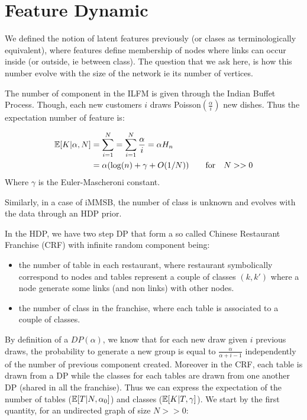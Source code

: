 \section{Feature Dynamic}

We defined the notion of latent features previously (or clases as terminologically equivalent), where features define membership of nodes where links can occur inside (or outside, ie between class).  The question that we ask here, is how this number evolve with the size of the network ie its number of vertices.


The number of component in the ILFM is given through the Indian Buffet Process. Though, each new customers $i$ draws Poisson$(\frac{\alpha}{i})$ new dishes. Thus the expectation number of feature is:

\begin{align*}
\mathbb{E}[K|\alpha, N] &= \sum_{i=1}^{N} = \sum_{i=1}^N \frac{\alpha}{i} = \alpha H_n \\
&= \alpha(\log(n) + \gamma +O(1/N) ) \qquad  \textnormal{for} \quad N >> 0
\end{align*}
Where $\gamma$ is the Euler-Mascheroni constant.

Similarly, in a case of iMMSB, the number of class is unknown and evolves with the data through an HDP prior.

In the HDP, we have two step DP that form a so called Chinese
Restaurant Franchise (CRF) with infinite random component being:
\begin{itemize}
\item the number of
table in each restaurant, where restaurant symbolically correspond to
nodes and tables represent a couple of classes $(k,k')$ where a node generate some links (and non links) with other nodes. 
\item the
number of class in the franchise, where each table is associated to a couple of classes.
\end{itemize}

By definition of a \(DP(\alpha)\), we know that for each new draw given
\(i\) previous draws, the probability to generate a new group is equal
to \(\frac{\alpha}{\alpha +i-1}\) independently of the number of previous
component created. Moreover in the CRF, each table is drawn from a DP while the classes for each tables are drawn from one another DP (shared in all the franchise). Thus we can express the expectation of the number of tables ($\mathbb{E}[T|N, \alpha_0]$) and classes ($\mathbb{E}[K|T, \gamma]$). We start by the first quantity, for an undirected graph of size $N >> 0$:

